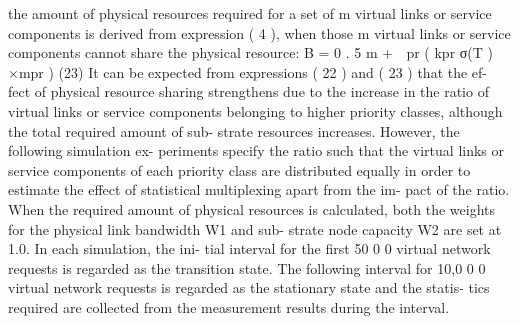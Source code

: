 the amount of physical resources required for a set of m virtual links or service components is derived from expression ( 4 ), when those m virtual links or service components cannot share the physical resource: B = 0 . 5 m +  pr ( kpr σ(T ) ×mpr ) (23) It can be expected from expressions ( 22 ) and ( 23 ) that the ef- fect of physical resource sharing strengthens due to the increase in the ratio of virtual links or service components belonging to higher priority classes, although the total required amount of sub- strate resources increases. However, the following simulation ex- periments specify the ratio such that the virtual links or service components of each priority class are distributed equally in order to estimate the effect of statistical multiplexing apart from the im- pact of the ratio. When the required amount of physical resources is calculated, both the weights for the physical link bandwidth W1 and sub- strate node capacity W2 are set at 1.0. In each simulation, the ini- tial interval for the first 50 0 0 virtual network requests is regarded as the transition state. The following interval for 10,0 0 0 virtual network requests is regarded as the stationary state and the statis- tics required are collected from the measurement results during the interval.



